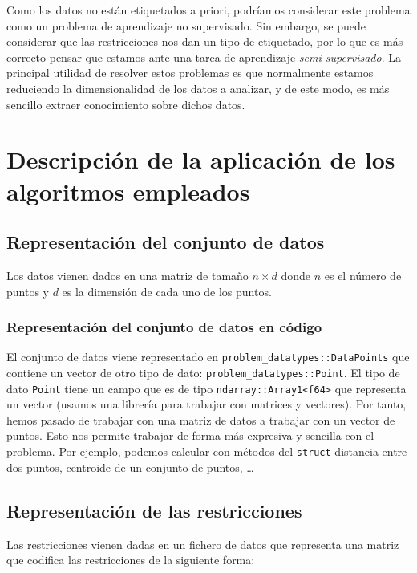 \documentclass[11pt]{article}
\begin{document}
Como los datos no están etiquetados a priori, podríamos considerar este problema como un problema de aprendizaje no supervisado. Sin embargo, se puede considerar que las restricciones nos dan un tipo de etiquetado, por lo que es más correcto pensar que estamos ante una tarea de aprendizaje \emph{semi-supervisado}. La principal utilidad de resolver estos problemas es que normalmente estamos reduciendo la dimensionalidad de los datos a analizar, y de este modo, es más sencillo extraer conocimiento sobre dichos datos.

\pagebreak

\section{Descripción de la aplicación de los algoritmos empleados}

\subsection{Representación del conjunto de datos}

Los datos vienen dados en una matriz de tamaño $n \times d$ donde $n$ es el número de puntos y $d$ es la dimensión de cada uno de los puntos.

\subsubsection{Representación del conjunto de datos en código}

El conjunto de datos viene representado en \lstinline{problem_datatypes::DataPoints} que contiene un vector de otro tipo de dato: \lstinline{problem_datatypes::Point}. El tipo de dato \lstinline{Point} tiene un campo que es de tipo \lstinline{ndarray::Array1<f64>} que representa un vector (usamos una librería para trabajar con matrices y vectores). Por tanto, hemos pasado de trabajar con una matriz de datos a trabajar con un vector de puntos. Esto nos permite trabajar de forma más expresiva y sencilla con el problema. Por ejemplo, podemos calcular con métodos del \lstinline{struct} distancia entre dos puntos, centroide de un conjunto de puntos, \ldots

\subsection{Representación de las restricciones}

Las restricciones vienen dadas en un fichero de datos que representa una matriz que codifica las restricciones de la siguiente forma:
\end{document}
